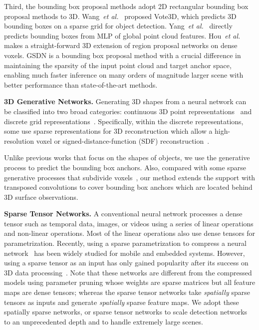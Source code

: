\documentclass[runningheads]{llncs}
\newcommand{\etal}{\textit{et al.}}
\newcommand{\methodname}{GSDN\xspace}
\begin{document}
Third, the bounding box proposal methods adopt 2D rectangular bounding box proposal methods to 3D. Wang~\etal~\cite{wang2015voting} proposed Vote3D, which predicts 3D bounding boxes on a sparse grid for object detection. Yang~\etal~\cite{yang2019learning} directly predicts bounding boxes from MLP of global point cloud features. Hou~\etal~\cite{hou20193d} makes a straight-forward 3D extension of region proposal networks on dense voxels. \methodname is a bounding box proposal method with a crucial difference in maintaining the sparsity of the input point cloud and target anchor space, enabling much faster inference on many orders of magnitude larger scene with better performance than state-of-the-art methods.








\noindent\textbf{3D Generative Networks.} Generating 3D shapes from a neural network can be classified into two broad categories: continuous 3D point representations~\cite{Meschedar2019,Park_2019_CVPR,yuan2018pcn,topnet2019} and discrete grid representations~\cite{choy20163d,ogn2017,minkowskinet,dai2018scancomplete,dai2019sg}. Specifically, within the discrete representations, some use sparse representations for 3D reconstruction which allow a high-resolution voxel or signed-distance-function (SDF) reconstruction~\cite{ogn2017,minkowskinet,dai2018scancomplete,dai2019sg}. 

Unlike previous works that focus on the shapes of objects, we use the generative process to predict the bounding box anchors. Also, compared with some sparse generative processes that subdivide voxels~\cite{ogn2017,dai2019sg}, our method extends the support with transposed convolutions to cover bounding box anchors which are located behind 3D surface observations.



\noindent\textbf{Sparse Tensor Networks.}
A conventional neural network processes a dense tensor such as temporal data, images, or videos using a series of linear operations and non-linear operations. Most of the linear operations also use dense tensors for parametrization. Recently, using a sparse parametrization to compress a neural network~\cite{han2015deep,parashar2017scnn,narang2017exploring} has been widely studied for mobile and embedded systems. However, using a sparse tensor as an input has only gained popularity after its success on 3D data processing~\cite{sparseconvnet,SubmanifoldSparseConvNet,minkowskinet,FCGF2019}. Note that these networks are different from the compressed models using parameter pruning whose weights are sparse matrices but all feature maps are dense tensors; whereas the sparse tensor networks take \textit{spatially} sparse tensors as inputs and generate \textit{spatially} sparse feature maps. We adopt these spatially sparse networks, or sparse tensor networks to scale detection networks to an unprecedented depth and to handle extremely large scenes.
\end{document}
